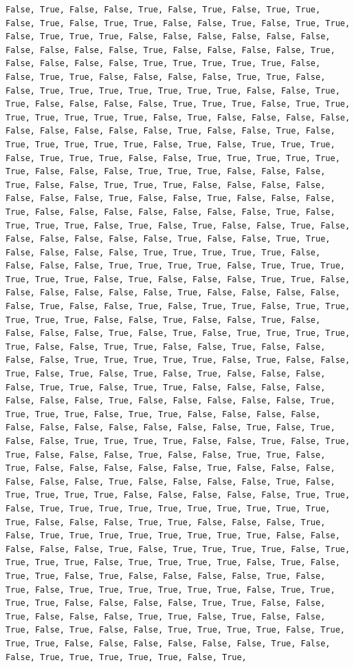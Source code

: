 \documentclass[
  letterpaper,
  DIV=11,
  numbers=noendperiod]{scrartcl}
\begin{document}
\begin{verbatim}
False, True, False, False, True, False, True, False, True, True, False, True, False, True, True, False, False, True, False, True, True, False, True, True, True, False, False, False, False, False, False, False, False, False, False, True, False, False, False, False, True, False, False, False, False, True, True, True, True, True, False, False, True, True, False, False, False, False, True, True, False, False, True, True, True, True, True, True, True, False, False, True, True, False, False, False, False, True, True, True, False, True, True, True, True, True, True, True, False, True, False, False, False, False, False, False, False, False, False, True, False, False, True, False, True, True, True, True, True, False, True, False, True, True, True, False, True, True, True, False, False, True, True, True, True, True, True, False, False, False, True, True, True, False, False, False, True, False, False, True, True, True, False, False, False, False, False, False, False, True, False, False, True, False, False, False, True, False, False, False, False, False, False, False, True, False, True, True, True, False, True, False, True, False, False, True, False, False, False, False, False, False, True, False, False, True, True, False, False, False, False, True, True, True, True, True, False, False, False, False, True, True, True, True, False, True, True, True, True, True, True, False, True, False, False, False, True, True, False, False, False, False, False, False, True, False, False, False, False, False, True, False, False, True, False, True, True, False, True, True, True, True, True, False, False, True, False, False, True, False, False, False, False, True, False, True, False, True, True, True, True, True, False, False, True, True, False, False, True, False, False, False, False, True, True, True, True, True, False, True, False, False, True, False, True, False, True, False, True, False, False, False, False, True, True, False, True, True, False, False, False, False, False, False, False, True, False, False, False, False, False, True, True, True, True, False, True, True, False, False, False, False, False, False, False, False, False, False, False, True, False, True, False, False, True, True, True, True, False, False, True, False, True, True, False, False, False, True, False, False, True, True, False, True, False, False, False, False, False, True, False, False, False, False, False, False, True, False, False, False, False, True, False, True, True, True, True, False, False, False, False, False, True, True, False, True, True, True, True, True, True, True, True, True, True, True, False, False, False, True, True, False, False, False, True, False, True, True, True, True, True, True, True, True, False, False, False, False, False, True, False, True, True, True, True, False, True, True, True, True, False, True, True, True, True, False, True, False, True, True, False, True, False, False, False, False, True, False, True, False, True, True, True, True, True, True, False, True, True, True, True, False, False, False, False, True, True, False, False, True, False, False, False, True, True, False, True, False, False, True, False, True, False, False, True, True, True, True, False, True, True, True, False, False, False, False, False, False, True, False, False, True, True, True, True, True, False, True, 
\end{verbatim}
\end{document}
